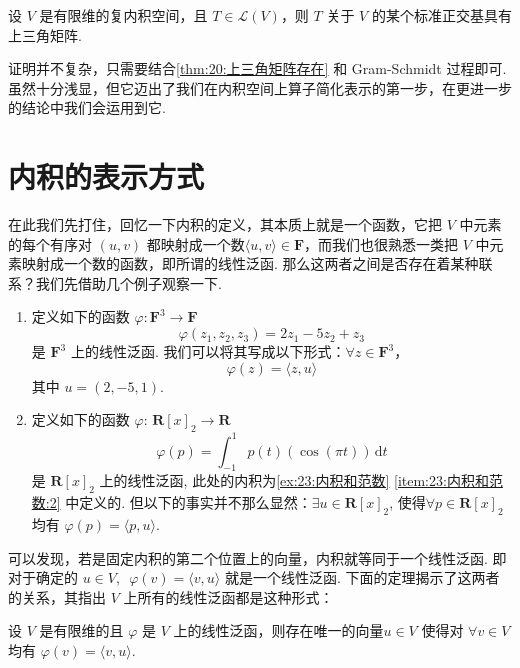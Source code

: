 \begin{theorem}[Schur 定理] \label{thm:23:Schur} 
    设 $ V $ 是有限维的复内积空间，且 $ T \in \mathcal{L}(V) $，则 $ T $ 关于 $ V $ 的某个标准正交基具有上三角矩阵.
\end{theorem}

证明并不复杂，只需要结合\autoref{thm:20:上三角矩阵存在} 和 Gram-Schmidt 过程即可. 虽然十分浅显，但它迈出了我们在内积空间上算子简化表示的第一步，在更进一步的结论中我们会运用到它.

\section{内积的表示方式}

在此我们先打住，回忆一下内积的定义，其本质上就是一个函数，它把 $ V $ 中元素的每个有序对 $(u, v)$ 都映射成一个数$ \langle u, v \rangle \in \mathbf{F}$，而我们也很熟悉一类把 $ V $ 中元素映射成一个数的函数，即所谓的线性泛函. 那么这两者之间是否存在着某种联系？我们先借助几个例子观察一下.

\begin{example}
    \begin{enumerate}
        \item 定义如下的函数 $\varphi : \mathbf{F}^{3} \rightarrow \mathbf{F}$
              \[\varphi(z_1, z_2, z_3) = 2z_1 - 5z_2 + z_3\]
              是 $\mathbf{F}^{3}$ 上的线性泛函. 我们可以将其写成以下形式：$ \forall z \in \mathbf{F}^{3}$，
              \[\varphi(z) = \langle z, u\rangle\]
              其中 $u = (2, -5, 1)$.

        \item 定义如下的函数 $\varphi$: $\mathbf{R}[x]_2 \rightarrow \mathbf{R}$
              \[\varphi(p) = \int_{-1}^1 p(t)(\cos(\pi t))\,\mathrm{d}t\]
              是 $\mathbf{R}[x]_2$ 上的线性泛函, 此处的内积为\autoref{ex:23:内积和范数} \ref*{item:23:内积和范数:2} 中定义的. 但以下的事实并不那么显然：$ \exists u \in \mathbf{R}[x]_2$, 使得$\forall p \in \mathbf{R}[x]_2$ 均有 $ \varphi (p) = \langle p, u\rangle $.
    \end{enumerate}
\end{example}

可以发现，若是固定内积的第二个位置上的向量，内积就等同于一个线性泛函. 即对于确定的 $ u \in V , \enspace \varphi(v) = \langle v, u \rangle$ 就是一个线性泛函. 下面的定理揭示了这两者的关系，其指出 $ V $ 上所有的线性泛函都是这种形式：
\begin{theorem} \label{thm:23:Riesz} 
    设 $ V $ 是有限维的且 $ \varphi $ 是 $ V $ 上的线性泛函，则存在唯一的向量$u \in V$ 使得对 $\forall v \in V$ 均有 $ \varphi(v) = \langle v, u\rangle $.
\end{theorem}

